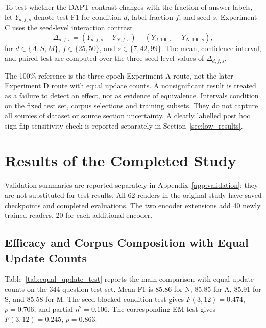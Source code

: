 \documentclass[pdflatex,sn-basic]{sn-jnl}
\begin{document}
\begin{samepage}
To test whether the DAPT contrast changes with the fraction of answer labels,
let \(Y_{d,f,s}\) denote test F1 for condition \(d\), label fraction \(f\), and
seed \(s\). Experiment C uses the seed-level interaction contrast
\[
\Delta_{d,f,s}
=
\left(Y_{d,f,s}-Y_{N,f,s}\right)
-
\left(Y_{d,100,s}-Y_{N,100,s}\right),
\]
for \(d\in\{A,S,M\}\), \(f\in\{25,50\}\), and
\(s\in\{7,42,99\}\). The mean, confidence interval, and paired test are
computed over the three seed-level values of \(\Delta_{d,f,s}\).
\end{samepage}
The 100\% reference is the three-epoch Experiment A route, not the later
Experiment D route with equal update counts.
A nonsignificant result is treated as a failure to detect an effect, not as
evidence of equivalence.
Intervals condition on the fixed test set, corpus selections and training
subsets. They do not capture all sources of dataset or source section
uncertainty. A clearly labelled post hoc sign flip sensitivity check is
reported separately in Section~\ref{sec:low_results}.

\FloatBarrier

\section{Results of the Completed Study}\label{sec:results}

Validation summaries are reported separately in Appendix~\ref{app:validation};
they are not substituted for test results. All 62 readers in the original
study have saved checkpoints and completed evaluations. The two encoder
extensions add 40 newly trained readers, 20 for each additional encoder.

\subsection{Efficacy and Corpus Composition with Equal Update Counts}
\label{sec:equal_update_results}

Table~\ref{tab:equal_update_test} reports the main comparison with equal update counts on
the 344-question test set. Mean F1 is 85.86 for N, 85.85 for A, 85.91 for S,
and 85.58 for M. The seed blocked condition test gives
\(F(3,12)=0.474\), \(p=0.706\), and partial \(\eta^2=0.106\).
The corresponding EM test gives \(F(3,12)=0.245\), \(p=0.863\).
\end{document}
